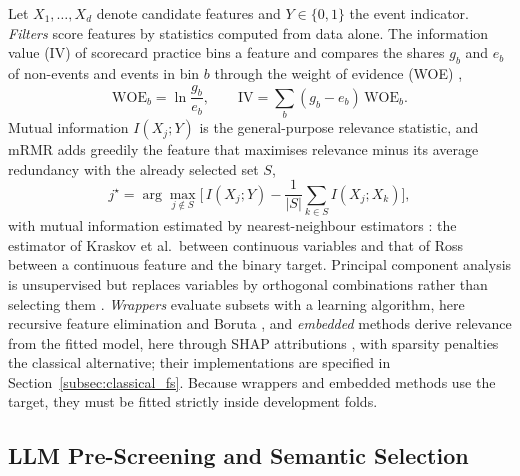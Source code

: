 \documentclass[final,5p,twocolumn]{elsarticle}
\begin{document}
Let $X_1,\dots,X_d$ denote candidate features and $Y\in\{0,1\}$ the event indicator. \emph{Filters} score features by statistics computed from data alone. The information value (IV) of scorecard practice bins a feature and compares the shares $g_b$ and $e_b$ of non-events and events in bin $b$ through the weight of evidence (WOE) \cite{siddiqi2006},
\begin{equation}
    \mathrm{WOE}_b=\ln\frac{g_b}{e_b},\qquad
    \mathrm{IV}=\sum_{b}(g_b-e_b)\,\mathrm{WOE}_b .
    \label{eq:iv}
\end{equation}
Mutual information $I(X_j;Y)$ is the general-purpose relevance statistic, and mRMR \cite{peng2005} adds greedily the feature that maximises relevance minus its average redundancy with the already selected set $S$,
\begin{equation}
    j^{\star}=\arg\max_{j\notin S}\Big[\,I(X_j;Y)-\frac{1}{|S|}\sum_{k\in S} I(X_j;X_k)\Big],
    \label{eq:mrmr}
\end{equation}
with mutual information estimated by nearest-neighbour estimators \cite{kraskov2004,ross2014}: the estimator of Kraskov et al.\ between continuous variables and that of Ross between a continuous feature and the binary target. Principal component analysis is unsupervised but replaces variables by orthogonal combinations rather than selecting them \cite{jolliffe2016}. \emph{Wrappers} evaluate subsets with a learning algorithm, here recursive feature elimination \cite{guyon2002} and Boruta \cite{kursa2010,breiman2001}, and \emph{embedded} methods derive relevance from the fitted model, here through SHAP attributions \cite{lundberg2017}, with sparsity penalties \cite{tibshirani1996} the classical alternative; their implementations are specified in Section~\ref{subsec:classical_fs}. Because wrappers and embedded methods use the target, they must be fitted strictly inside development folds.

\subsection{LLM Pre-Screening and Semantic Selection}
\label{subsec:llm_fs_background}
\end{document}
